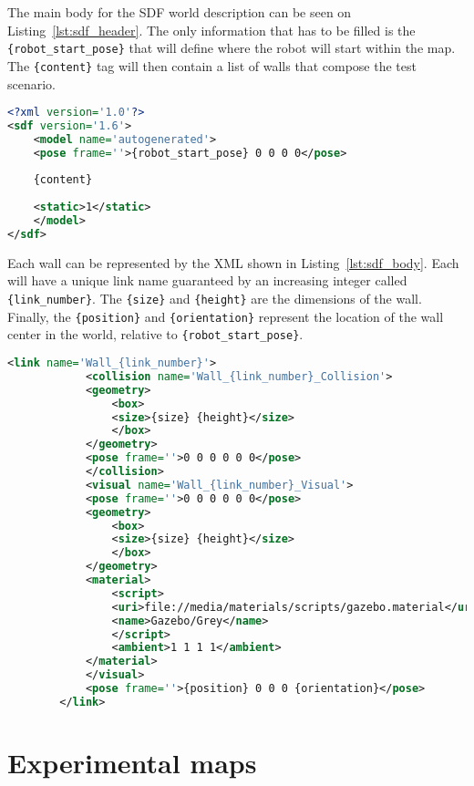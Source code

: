 The main body for the SDF world description can be seen on Listing~\ref{lst:sdf_header}. The only information that has to be filled is the \texttt{\{robot\_start\_pose\}} that will define where the robot will start within the map. The \texttt{\{content\}} tag will then contain a list of walls that compose the test scenario.

\begin{lstlisting}[caption={SDF Header.},label={lst:sdf_header},language=XML]
<?xml version='1.0'?>
<sdf version='1.6'>
    <model name='autogenerated'>
    <pose frame=''>{robot_start_pose} 0 0 0 0</pose>
    
    {content}
    
    <static>1</static>
    </model>
</sdf>
\end{lstlisting} \label{lst:1}

Each wall can be represented by the XML shown in Listing~\ref{lst:sdf_body}. Each will have a unique link name guaranteed by an increasing integer called \texttt{\{link\_number\}}. The \texttt{\{size\}} and \texttt{\{height\}} are the dimensions of the wall. Finally, the \texttt{\{position\}} and \texttt{\{orientation\}} represent the location of the wall center in the world, relative to \texttt{\{robot\_start\_pose\}}.

\begin{lstlisting}[caption={SDF for a single wall.},label={lst:sdf_body},language=XML]
        <link name='Wall_{link_number}'>
            <collision name='Wall_{link_number}_Collision'>
            <geometry>
                <box>
                <size>{size} {height}</size>
                </box>
            </geometry>
            <pose frame=''>0 0 0 0 0 0</pose>
            </collision>
            <visual name='Wall_{link_number}_Visual'>
            <pose frame=''>0 0 0 0 0 0</pose>
            <geometry>
                <box>
                <size>{size} {height}</size>
                </box>
            </geometry>
            <material>
                <script>
                <uri>file://media/materials/scripts/gazebo.material</uri>
                <name>Gazebo/Grey</name>
                </script>
                <ambient>1 1 1 1</ambient>
            </material>
            </visual>
            <pose frame=''>{position} 0 0 0 {orientation}</pose>
        </link>
\end{lstlisting}

\section{Experimental maps}\label{sec:selecting_maps}

